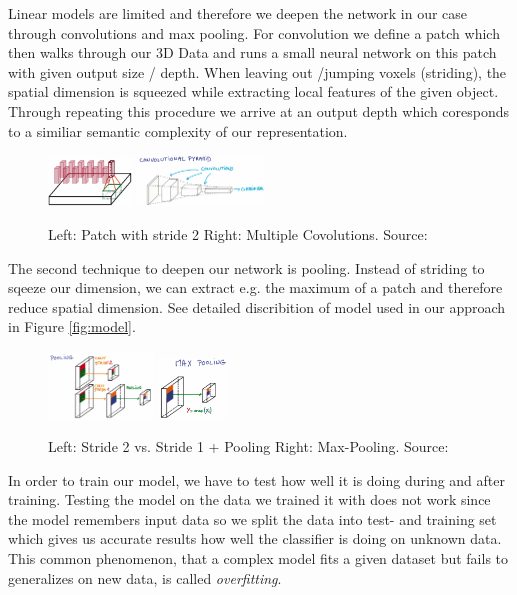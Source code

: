 \documentclass[10pt,twocolumn,letterpaper]{article}
\begin{document}
Linear models are limited and therefore we deepen the network in our case through convolutions and max pooling.
For convolution we define a patch which then walks through our 3D Data and runs a small neural network on this patch with given output size / depth. When leaving out /jumping voxels (striding), the spatial dimension is squeezed while extracting local features of the given object. 
Through repeating this procedure we arrive at an output depth which coresponds to a similiar semantic complexity of our representation. 

\begin{figure}[h]
	\label{fig:convolution}
	\includegraphics[width=0.2\textwidth]{conv}
	\includegraphics[width=0.3\textwidth]{pyra}
	\caption{Left: Patch with stride 2 \quad Right: Multiple Covolutions. Source: \cite{udacity}}
\end{figure}

The second technique to deepen our network is pooling. Instead of striding to sqeeze our dimension, we can extract e.g. the maximum of a patch and therefore reduce spatial dimension. See detailed discribition of model used in our approach in Figure \ref{fig:model}.

\begin{figure}[h]
	\label{fig:pooling}
	\includegraphics[width=0.25\textwidth]{con_max}
	\includegraphics[width=0.16\textwidth]{max}
	\caption{Left: Stride 2 vs. Stride 1 + Pooling \quad Right: Max-Pooling. Source: \cite{udacity}}
\end{figure}

In order to train our model, we have to test how well it is doing during and after training. 
Testing the model on the data we trained it with does not work since the model remembers input data so we split the data into test- and training set which gives us accurate results how well the classifier is doing on unknown data. This common phenomenon, that a complex model fits a given dataset but fails to generalizes on new data, is called \textit{overfitting}.
\end{document}
